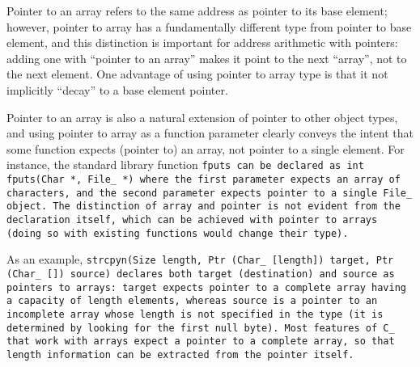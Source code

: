 Pointer to an array refers to the same address as pointer to its base element;
however, pointer to array has a fundamentally different type from
pointer to base element, and this distinction is important for address
arithmetic with pointers: adding one with ``pointer to an array''
makes it point to the next ``array'', not to the next element.
One advantage of using pointer to array type is that
it not implicitly ``decay'' to a base element pointer.

Pointer to an array is also a natural extension of pointer to other object types,
and using pointer to array as a function parameter clearly conveys the intent
that some function expects (pointer to) an array, not pointer to a single element.
For instance, the standard library function \tt{fputs} can be declared as
\tt{int fputs(Char *, File_ *)} where the first parameter expects an array of
characters, and the second parameter expects pointer to a single \tt{File_} object.
The distinction of array and pointer is not evident from the
declaration itself, which can be achieved with pointer to arrays
(doing so with existing functions would change their type).

As an example,
\tt{strcpyn(Size length, Ptr (Char_ [length]) target, Ptr (Char_ []) source)}
declares both \tt{target} (destination) and \tt{source} as pointers to arrays:
\tt{target} expects pointer to a complete array having a capacity of \tt{length}
elements, whereas source is a pointer to an incomplete array whose length is
not specified in the type (it is determined by looking for the first null byte).
Most features of C\_ that work with arrays expect a pointer to a complete array,
so that length information can be extracted from the pointer itself.
